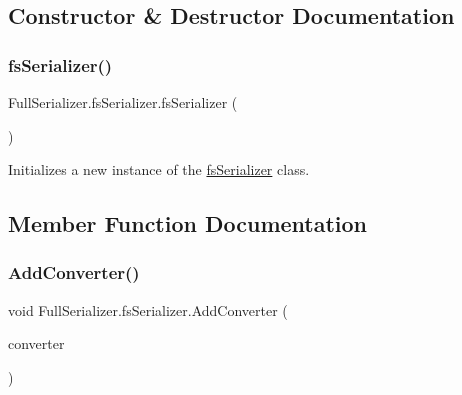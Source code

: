 \subsection{Constructor \& Destructor Documentation}
\mbox{\label{class_full_serializer_1_1fs_serializer_a1b55c4158e74f88a916214128f345e7d}} 
\subsubsection{\texorpdfstring{fs\+Serializer()}{fsSerializer()}}
{\footnotesize\ttfamily Full\+Serializer.\+fs\+Serializer.\+fs\+Serializer (\begin{DoxyParamCaption}{ }\end{DoxyParamCaption})\hspace{0.3cm}{\ttfamily [inline]}}



Initializes a new instance of the \hyperlink{class_full_serializer_1_1fs_serializer}{fs\+Serializer} class. 



\subsection{Member Function Documentation}
\mbox{\label{class_full_serializer_1_1fs_serializer_aa9f27b67927f4e097ba578dd4d0145d2}} 
\subsubsection{\texorpdfstring{Add\+Converter()}{AddConverter()}}
{\footnotesize\ttfamily void Full\+Serializer.\+fs\+Serializer.\+Add\+Converter (\begin{DoxyParamCaption}\item[{\hyperlink{class_full_serializer_1_1fs_base_converter}{fs\+Base\+Converter}}]{converter }\end{DoxyParamCaption})\hspace{0.3cm}{\ttfamily [inline]}}




